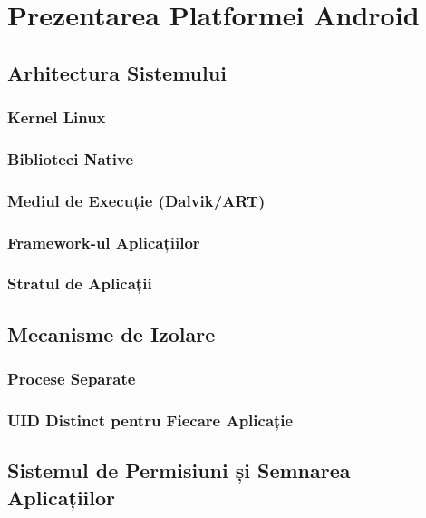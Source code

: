 \documentclass[11pt,a4paper,twocolumn]{article}
\theoremstyle{definition}
\theoremstyle{plain}
\theoremstyle{remark}
\begin{document}
\section{Prezentarea Platformei Android}

\subsection{Arhitectura Sistemului}

\subsubsection{Kernel Linux}

\subsubsection{Biblioteci Native}

\subsubsection{Mediul de Execuție (Dalvik/ART)}

\subsubsection{Framework-ul Aplicațiilor}

\subsubsection{Stratul de Aplicații}

\subsection{Mecanisme de Izolare}

\subsubsection{Procese Separate}

\subsubsection{UID Distinct pentru Fiecare Aplicație}

\subsection{Sistemul de Permisiuni și Semnarea Aplicațiilor}
\end{document}
